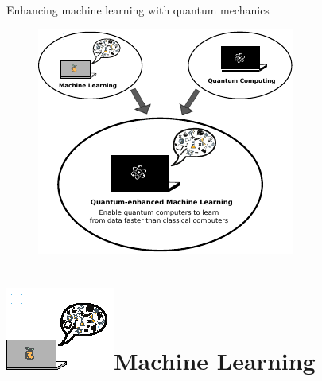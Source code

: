 \documentclass[10pt]{beamer}
\begin{document}
{
\begin{frame}[fragile]{Enhancing machine learning with quantum mechanics}

\begin{figure}
\centering
\includegraphics[scale=1.7]{Vectors/laptop_qml_flowchart.pdf}
\end{figure}

\end{frame}
}


\section{\protect\includegraphics[scale=3.5]{Vectors/laptop_ml.eps}\newline Machine Learning
}
\end{document}

